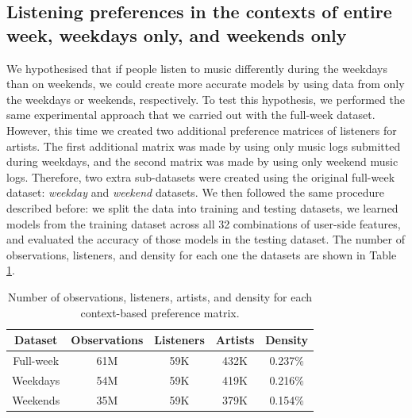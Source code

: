 





\subsection{Listening preferences in the contexts of entire week, weekdays only, and weekends only}
We hypothesised that if people listen to music differently during the weekdays than on weekends, we could create more accurate models by using data from only the weekdays or weekends, respectively.
To test this hypothesis, we performed the same experimental approach that we carried out with the full-week dataset. 
However, this time we created two additional preference matrices of listeners for artists.
The first additional matrix was made by using only music logs submitted during weekdays, and the second matrix was made by  using only weekend music logs. 
Therefore, two extra sub-datasets were created using the original full-week dataset: \emph{weekday} and \emph{weekend} datasets. We then followed the same procedure described  before: we split the data into training and testing datasets, we learned models from the training dataset across all 32 combinations of user-side  features, and evaluated the accuracy of those models in the testing dataset. 
The number of observations, listeners, and density for each one the datasets are shown in Table \ref{tab:3_datasets}.


\begin{table}[h]
 \caption{Number of observations, listeners, artists, and density for each context-based preference matrix.} \label{tab:3_datasets}
 \begin{center}
 \small
\begin{tabular}{ccccc}
  \hline
  Dataset & Observations & Listeners  & Artists  & Density \\
  \hline
  Full-week  & 61M & 59K & 432K & 0.237\%\\
  Weekdays & 54M & 59K & 419K & 0.216\% \\
  Weekends & 35M & 59K & 379K & 0.154\%\\
  \hline
 \end{tabular}
\end{center}

\end{table}

